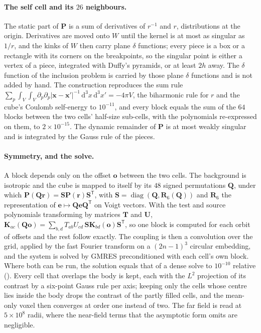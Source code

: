 \documentclass[11pt,a4paper]{article}
\newcommand{\bK}{\mathbf{K}}
\newcommand{\bP}{\mathbf{P}}
\newcommand{\dd}{\mathrm{d}}
\begin{document}
\paragraph{The self cell and its $26$ neighbours.} The static part of $\bP$ is a sum of derivatives of
$r^{-1}$ and $r$, distributions at the origin. Derivatives are moved onto $W$ until the kernel is at most
as singular as $1/r$, and the kinks of $W$ then carry plane $\delta$ functions; every piece is a box or a
rectangle with its corners on the breakpoints, so the singular point is either a vertex of a piece,
integrated with Duffy's pyramids, or at least $2h$ away. The $\delta$ function of the inclusion problem
is carried by those plane $\delta$ functions and is not added by hand. The construction reproduces the
sum rule $\sum_p\int_V\!\int_V\partial_p\partial_p\lvert\mathbf{x}-\mathbf{x}'\rvert^{-1}\,\dd^3x\,\dd^3x'=-4\pi V$, the biharmonic rule for
$r$ and the cube's Coulomb self-energy to $10^{-11}$, and every block equals the sum of the $64$ blocks
between the two cells' half-size sub-cells, with the polynomials re-expressed on them, to
$2\times10^{-15}$. The dynamic remainder of $\bP$ is at most weakly singular and is integrated by the
Gauss rule of the pieces.

\paragraph{Symmetry, and the solve.} A block depends only on the offset $\mathbf{o}$ between the two
cells. The background is isotropic and the cube is mapped to itself by its $48$ signed permutations
$\mathbf{Q}$, under which $\bP(\mathbf{Q}\mathbf{r})=\mathbf{S}\bP(\mathbf{r})\mathbf{S}^{\mathsf T}$, with
$\mathbf{S}=\operatorname{diag}(\mathbf{Q},\mathbf{R}_6(\mathbf{Q}))$ and $\mathbf{R}_6$ the representation of
$\mathbf{e}\mapsto\mathbf{Q}\mathbf{e}\mathbf{Q}^{\mathsf T}$ on Voigt vectors. With the test and source
polynomials transforming by matrices $\mathbf{T}$ and $\mathbf{U}$,
$\bK_{ac}(\mathbf{Q}\mathbf{o})=\sum_{b,d}T_{ab}U_{cd}\,\mathbf{S}\bK_{bd}(\mathbf{o})\mathbf{S}^{\mathsf T}$,
so one block is computed for each orbit of offsets and the rest follow exactly. The coupling is then a
convolution over the grid, applied by the fast Fourier transform on a $(2n-1)^3$ circular embedding, and
the system is solved by GMRES preconditioned with each cell's own block. Where both can be run, the
solution equals that of a dense solve to $10^{-10}$ relative ().
Every cell that overlaps the body is kept, each with the $L^2$ projection of its contrast by a six-point
Gauss rule per axis; keeping only the cells whose centre lies inside the body drops the contrast of the
partly filled cells, and the mean-only voxel then converges at order one instead of two. The far field is
read at $5\times10^8$ radii, where the near-field terms that the asymptotic form omits are negligible.
\end{document}
